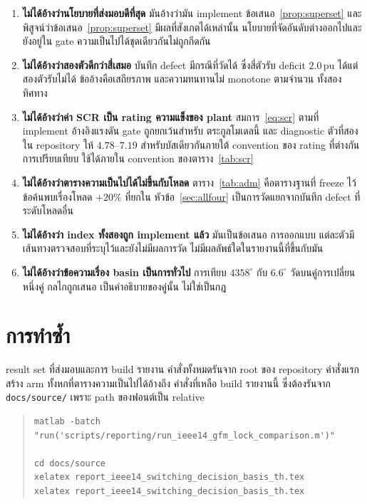 \documentclass[12pt,a4paper]{article}
\theoremstyle{remark}
\newcommand{\pu}{\,\mathrm{pu}}
\newcommand{\code}[1]{\texttt{\small #1}}
\begin{document}
\begin{enumerate}[leftmargin=1.9em]
\item \textbf{ไม่ได้อ้างว่านโยบายที่ส่งมอบดีที่สุด} มันอ้างว่ามัน implement
      ข้อเสนอ~\ref{prop:superset} และพิสูจน์ว่าข้อเสนอ~\ref{prop:superset}
      มีผลที่สังเกตได้เหล่านั้น นโยบายที่จัดอันดับต่างออกไปและยังอยู่ใน gate
      ความเป็นไปได้ชุดเดียวกันไม่ถูกกีดกัน
\item \textbf{ไม่ได้อ้างว่าสองตัวดีกว่าสี่เสมอ} บันทึก defect มีกรณีที่วัดได้
      ซึ่งสี่ตัวรับ deficit $2.0\pu$ ได้แต่สองตัวรับไม่ได้ ข้ออ้างคือเสถียรภาพ
      และความทนทานไม่ monotone ตามจำนวน ทั้งสองทิศทาง
\item \textbf{ไม่ได้อ้างว่าค่า SCR เป็น rating ความแข็งของ plant}
      สมการ~\eqref{eq:scr} ตามที่ implement อ้างอิงแรงดัน gate ถูกยกเว้นสำหรับ
      ตระกูลโมเดลนี้ และ diagnostic ตัวที่สองใน repository ให้ $4.78$--$7.19$
      สำหรับบัสเดียวกันภายใต้ convention ของ rating ที่ต่างกัน การเปรียบเทียบ
      ใช้ได้ภายใน convention ของตาราง~\ref{tab:scr}
\item \textbf{ไม่ได้อ้างว่าตารางความเป็นไปได้ไม่ขึ้นกับโหลด} ตาราง~\ref{tab:adm}
      คือตารางฐานที่ freeze ไว้ ข้อค้นพบเรื่องโหลด $+20\%$ ที่ยกใน
      หัวข้อ~\ref{sec:allfour} เป็นการวัดแยกจากบันทึก defect ที่ระดับโหลดอื่น
\item \textbf{ไม่ได้อ้างว่า index ทั้งสองถูก implement แล้ว} มันเป็นข้อเสนอ
      การออกแบบ แต่ละตัวมีเส้นทางตรวจสอบที่ระบุไว้และยังไม่มีผลการวัด
      ไม่มีผลลัพธ์ใดในรายงานนี้ที่ขึ้นกับมัน
\item \textbf{ไม่ได้อ้างว่าข้อความเรื่อง basin เป็นการทั่วไป} การเทียบ
      $4358^{\circ}$ กับ $6.6^{\circ}$ วัดบนคู่การเปลี่ยนหนึ่งคู่ กลไกถูกเสนอ
      เป็นคำอธิบายของคู่นั้น ไม่ใช่เป็นกฎ
\end{enumerate}

\section{การทำซ้ำ}\label{sec:repro}

result set ที่ส่งมอบและการ build รายงาน คำสั่งทั้งหมดรันจาก root ของ repository
คำสั่งแรกสร้าง arm ทั้งหกที่ตารางความเป็นไปได้อ้างถึง คำสั่งที่เหลือ build
รายงานนี้ ซึ่งต้องรันจาก \code{docs/source/} เพราะ path ของฟอนต์เป็น relative

\begin{quote}\small
\begin{verbatim}
matlab -batch "run('scripts/reporting/run_ieee14_gfm_lock_comparison.m')"

cd docs/source
xelatex report_ieee14_switching_decision_basis_th.tex
xelatex report_ieee14_switching_decision_basis_th.tex
\end{verbatim}
\end{quote}
\end{document}
